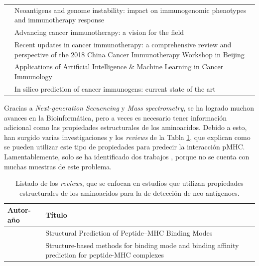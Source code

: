 \begin{table}[H]
\begin{tabular}{p{3cm}p{10cm}}
		\cite{mardis2019neoantigens}          & Neoantigens and genome instability: impact on immunogenomic phenotypes and immunotherapy response                                         \\
		\cite{de2019advancing}                & Advancing cancer immunotherapy: a vision for the field                                                                                    \\
		\cite{li2018recent}                   & Recent updates in cancer immunotherapy: a comprehensive review and perspective of the 2018 China Cancer Immunotherapy Workshop in Beijing \\
		\cite{sidhom2018applications}         & Applications of Artificial Intelligence \& Machine Learning in Cancer Immunology                                                          \\
		\cite{doytchinova2018silico}          & In silico prediction of cancer immunogens: current state of the art                                                                      
	\end{tabular}
\end{table}


Gracias a \textit{Next-generation Secuencing} y \textit{Mass spectrometry}, se ha logrado muchon avances en la Bioinformática, pero a veces es necesario tener información adicional como las propiedades estructurales de los aminoacidos. Debido a esto, han surgido varias investigaciones y los \textit{reviews} de la Tabla \ref{tab:review_structure}, que explican como se pueden utilizar este tipo de propiedades para predecir la interacción pMHC. Lamentablemente, solo se ha identificado dos trabajos \citep{perez2022structural,antunes2018structure}, porque no se cuenta con muchas muestras de este problema.



\begin{table}[H]
	\caption{Listado de los \textit{reviews}, que se enfocan en estudios que utilizan propiedades estructurales de los aminoacidos para la de detección de neo antígenoes.}
	\label{tab:review_structure}
	\begin{tabular}{p{3cm}p{10cm}}
		\textbf{Autor-año }                            & \textbf{Título}                                                                                                                             \\ \hline	
		\cite{perez2022structural}  & Structural Prediction of Peptide–MHC Binding Modes                                                 \\
		\cite{antunes2018structure} & Structure-based methods for binding mode and binding affinity prediction for peptide-MHC complexes \\		
	\end{tabular}
\end{table}


